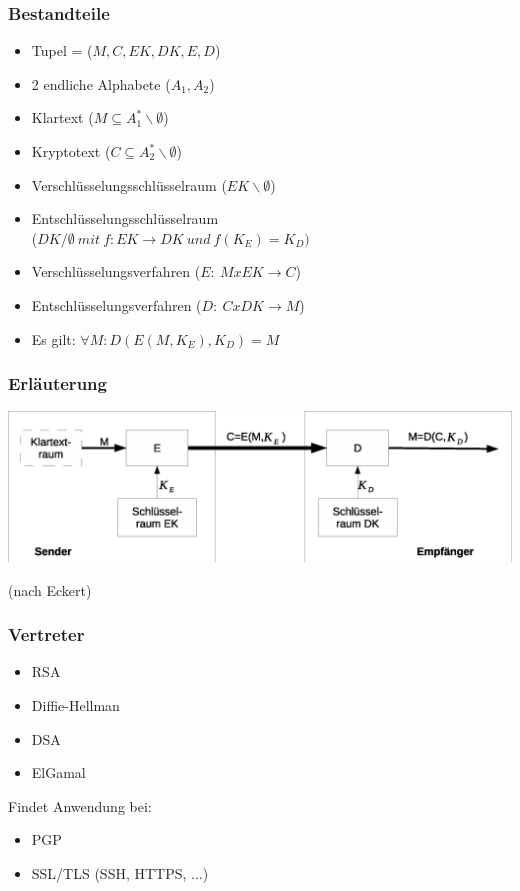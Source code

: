 \documentclass{beamer}
\begin{document}
\begin{frame}
\frametitle{Bestandteile}
\begin{itemize}
\item Tupel = ($M,C,EK,DK,E,D$)
\item 2 endliche Alphabete ($A_1,A_2$)
\item Klartext ($M \subseteq A^*_1\backslash\emptyset$)
\item Kryptotext ($C \subseteq A^*_2\backslash\emptyset$)
\item Verschlüsselungsschlüsselraum ($EK\backslash\emptyset$)
\item Entschlüsselungsschlüsselraum\\
($DK/\emptyset~mit~f:EK \rightarrow DK ~und~ f(K_E)=K_D)$
\item Verschlüsselungsverfahren ($E :~ M x EK \rightarrow C$)
\item Entschlüsselungsverfahren ($D :~ C x DK \rightarrow M$)
\item Es gilt: $\forall M : D(E(M,K_E),K_D) = M$
\end{itemize}
\end{frame}
\begin{frame}
\frametitle{Erläuterung}
\hspace*{-1cm}
\includegraphics[width=\paperwidth]{async.eps}

(nach Eckert\cite{Eckert13})
\end{frame}

\begin{frame}
\frametitle{Vertreter}
\begin{itemize}
\item RSA
\item Diffie-Hellman
\item DSA
\item ElGamal
\end{itemize}

\begin{block}{Findet Anwendung bei:}
\begin{itemize}
\item PGP
\item SSL/TLS (SSH, HTTPS, ...)
\end{itemize}
\end{block}
\end{frame}
\end{document}
